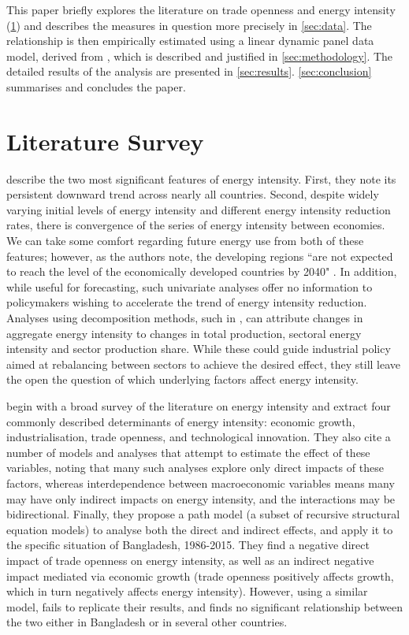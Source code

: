 \documentclass[12pt,a4paper]{article}
\begin{document}
This paper briefly explores the literature on trade openness and energy intensity (\cref{sec:literature}) and describes the measures in question more precisely in \cref{sec:data}.
The relationship is then empirically estimated using a linear dynamic panel data model, derived from \cite{arellanoTestsSpecificationPanel1991}, which is described and justified in \cref{sec:methodology}.
The detailed results of the analysis are presented in \cref{sec:results}. \cref{sec:conclusion} summarises and concludes the paper.

\section{Literature Survey}\label{sec:literature}

\cite{ederAnalysisEnergyIntensity2018} describe the two most significant features of energy intensity. First, they note its persistent downward trend across nearly all countries.
Second, despite widely varying initial levels of energy intensity and different energy intensity reduction rates, there is convergence of the series of energy intensity between economies.
We can take some comfort regarding future energy use from both of these features; however, as the authors note, the developing regions ``are not expected to reach the level of the economically developed countries by 2040" \citep[p. 1971]{ederAnalysisEnergyIntensity2018}.
In addition, while useful for forecasting, such univariate analyses offer no information to policymakers wishing to accelerate the trend of energy intensity reduction. 
Analyses using decomposition methods, such in \cite{liuEightMethodsDecomposing2003}, can attribute changes in aggregate energy intensity to changes in total production, sectoral energy intensity and sector production share. While these could guide industrial policy aimed at rebalancing between sectors to achieve the desired effect, they still leave the open the question of which underlying factors affect energy intensity.

\cite{panHowIndustrializationTrade2019} begin with a broad survey of the literature on energy intensity and extract four commonly described determinants of energy intensity: economic growth, industrialisation, trade openness, and technological innovation.
They also cite a number of models and analyses that attempt to estimate the effect of these variables, noting that many such analyses explore only direct impacts of these factors, whereas interdependence between macroeconomic variables means many may have only indirect impacts on energy intensity, and the interactions may be bidirectional.
Finally, they propose a path model (a subset of recursive structural equation models) to analyse both the direct and indirect effects, and apply it to the specific situation of Bangladesh, 1986-2015.
They find a negative direct impact of trade openness on energy intensity, as well as an indirect negative impact mediated via economic growth (trade openness positively affects growth, which in turn negatively affects energy intensity).
However, using a similar model, \cite{siardPathModelEnergy2020} fails to replicate their results, and finds no significant relationship between the two either in Bangladesh or in several other countries.  
\end{document}
